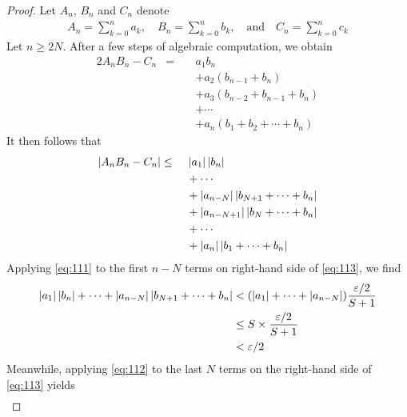 \documentclass[thmcnt=section, 12pt]{my-elegantbook}
\begin{document}
\begin{proof}
    Let $A_n$, $B_n$ and $C_n$ denote
    \begin{align*}
        A_n = \sum_{k=0}^n a_k,
        \quad
        B_n = \sum_{k=0}^n b_k,
        \quad \text{and} \quad
        C_n = \sum_{k=0}^n c_k
    \end{align*}
    Let $n \geq 2N$. After a few steps of algebraic computation, we obtain
    \begin{alignat*}{2}
        A_n B_n - C_n
         & = & \; & a_1 b_n                          \\
         &   &    & + a_2 (b_{n-1} + b_n)            \\
         &   &    & + a_3 (b_{n-2} + b_{n-1} + b_n)  \\
         &   &    & + \cdots                         \\
         &   &    & + a_n (b_1 + b_2 + \cdots + b_n)
    \end{alignat*}
    It then follows that
    \begin{alignat}{2}
        \left\lvert A_n B_n - C_n \right\rvert
         & \leq & \; & \left\lvert a_1 \right\rvert \left\lvert b_n \right\rvert \nonumber                          \\
         &      &    & + \cdots \nonumber                                     \\
         &      &    & + \left\lvert a_{n-N} \right\rvert \left\lvert b_{N+1} + \cdots + b_n \right\rvert \nonumber \\
         &      &    & + \left\lvert a_{n-N+1} \right\rvert \left\lvert b_{N} + \cdots + b_n \right\rvert \nonumber \\
         &      &    & + \cdots \nonumber                                     \\
         &      &    & + \left\lvert a_n \right\rvert \left\lvert b_{1} + \cdots + b_n \right\rvert
        \label{eq:113}
    \end{alignat}
    Applying \eqref{eq:111} to the first $n-N$ terms on right-hand side of \eqref{eq:113}, we find
    \begin{align}
        \left\lvert a_1 \right\rvert\left\lvert b_n \right\rvert
        + \cdots
        + \left\lvert a_{n-N} \right\rvert \left\lvert b_{N+1} + \cdots + b_n \right\rvert
         & < (\left\lvert a_1 \right\rvert + \cdots + \left\lvert a_{n-N} \right\rvert) \frac{\varepsilon / 2}{S + 1} \nonumber \\
         & \leq S \times \frac{\varepsilon / 2}{S + 1} \nonumber                          \\
         & < \varepsilon / 2
        \label{eq:114}
    \end{align}
    Meanwhile, applying \eqref{eq:112} to the last $N$ terms on the right-hand side of \eqref{eq:113} yields
    \begin{multline}

\end{multline}
\end{proof}
\end{document}
